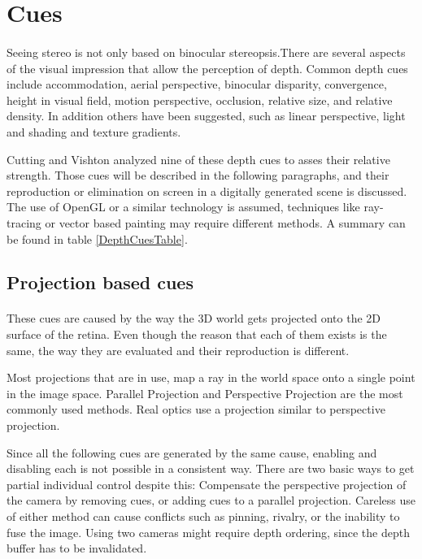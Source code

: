\section{Cues\label{Cues}}
\paragraph{}
Seeing stereo is not only based on binocular stereopsis.There are several aspects of the visual impression that allow the perception of depth. Common depth cues include accommodation, aerial perspective, binocular disparity, convergence, height in visual field, motion perspective, occlusion, relative size, and relative density. In addition others have been suggested, such as linear perspective, light and shading and texture gradients.%

Cutting and Vishton\cite{DepthCues} analyzed nine of these depth cues to asses their relative strength. Those cues will be described in the following paragraphs, and their reproduction or elimination on screen in a digitally generated scene is discussed. The use of OpenGL or a similar technology is assumed, techniques like ray-tracing or vector based painting may require different methods. A summary can be found in table \ref{DepthCuesTable}.


\subsection{Projection based cues}
\paragraph{}
These cues are caused by the way the 3D world gets projected onto the 2D surface of the retina.
Even though the reason that each of them exists is the same, the way they are evaluated and their reproduction is different.

Most projections\cite{proj} that are in use, map a ray in the world space onto a single point in the image space. Parallel Projection\cite{parallel} and Perspective Projection\cite{perspective} are the most commonly used methods. Real optics use a projection similar to perspective projection.

Since all the following cues are generated by the same cause, enabling and disabling each is not possible in a consistent way. There are two basic ways to get partial individual control despite this: Compensate  the perspective projection of the camera by removing cues, or  adding cues to a parallel projection. Careless use of either method can cause conflicts such as pinning, rivalry, or the inability to fuse the image.
Using two cameras might require depth ordering, since the depth buffer has to be invalidated.


